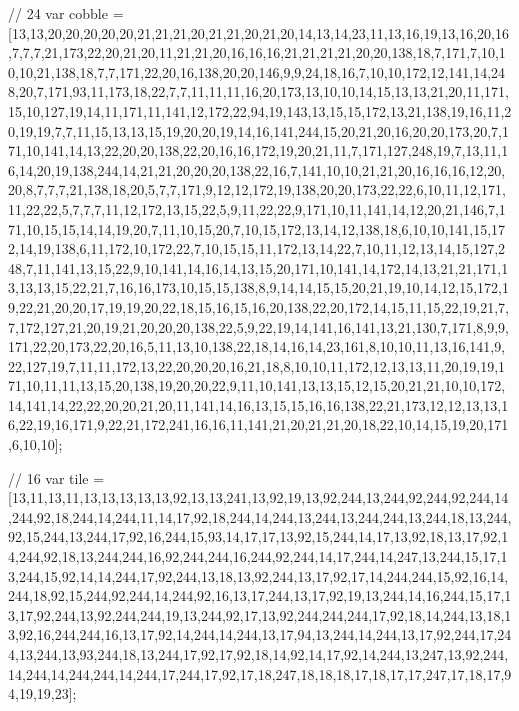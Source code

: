 // 24
var cobble = [13,13,20,20,20,20,20,21,21,21,20,21,21,20,21,20,14,13,14,23,11,13,16,19,13,16,20,16,7,7,7,21,173,22,20,21,20,11,21,21,20,16,16,16,21,21,21,21,20,20,138,18,7,171,7,10,10,10,21,138,18,7,7,171,22,20,16,138,20,20,146,9,9,24,18,16,7,10,10,172,12,141,14,248,20,7,171,93,11,173,18,22,7,7,11,11,11,16,20,173,13,10,10,14,15,13,13,21,20,11,171,15,10,127,19,14,11,171,11,141,12,172,22,94,19,143,13,15,15,172,13,21,138,19,16,11,20,19,19,7,7,11,15,13,13,15,19,20,20,19,14,16,141,244,15,20,21,20,16,20,20,173,20,7,171,10,141,14,13,22,20,20,138,22,20,16,16,172,19,20,21,11,7,171,127,248,19,7,13,11,16,14,20,19,138,244,14,21,21,20,20,20,138,22,16,7,141,10,10,21,21,20,16,16,16,12,20,20,8,7,7,7,21,138,18,20,5,7,7,171,9,12,12,172,19,138,20,20,173,22,22,6,10,11,12,171,11,22,22,5,7,7,7,11,12,172,13,15,22,5,9,11,22,22,9,171,10,11,141,14,12,20,21,146,7,171,10,15,15,14,14,19,20,7,11,10,15,20,7,10,15,172,13,14,12,138,18,6,10,10,141,15,172,14,19,138,6,11,172,10,172,22,7,10,15,15,11,172,13,14,22,7,10,11,12,13,14,15,127,248,7,11,141,13,15,22,9,10,141,14,16,14,13,15,20,171,10,141,14,172,14,13,21,21,171,13,13,13,15,22,21,7,16,16,173,10,15,15,138,8,9,14,14,15,15,20,21,19,10,14,12,15,172,19,22,21,20,20,17,19,19,20,22,18,15,16,15,16,20,138,22,20,172,14,15,11,15,22,19,21,7,7,172,127,21,20,19,21,20,20,20,138,22,5,9,22,19,14,141,16,141,13,21,130,7,171,8,9,9,171,22,20,173,22,20,16,5,11,13,10,138,22,18,14,16,14,23,161,8,10,10,11,13,16,141,9,22,127,19,7,11,11,172,13,22,20,20,20,16,21,18,8,10,10,11,172,12,13,13,11,20,19,19,171,10,11,11,13,15,20,138,19,20,20,22,9,11,10,141,13,13,15,12,15,20,21,21,10,10,172,14,141,14,22,22,20,20,21,20,11,141,14,16,13,15,15,16,16,138,22,21,173,12,12,13,13,16,22,19,16,171,9,22,21,172,241,16,16,11,141,21,20,21,21,20,18,22,10,14,15,19,20,171,6,10,10];

// 16
var tile = [13,11,13,11,13,13,13,13,13,92,13,13,241,13,92,19,13,92,244,13,244,92,244,92,244,14,244,92,18,244,14,244,11,14,17,92,18,244,14,244,13,244,13,244,244,13,244,18,13,244,92,15,244,13,244,17,92,16,244,15,93,14,17,17,13,92,15,244,14,17,13,92,18,13,17,92,14,244,92,18,13,244,244,16,92,244,244,16,244,92,244,14,17,244,14,247,13,244,15,17,13,244,15,92,14,14,244,17,92,244,13,18,13,92,244,13,17,92,17,14,244,244,15,92,16,14,244,18,92,15,244,92,244,14,244,92,16,13,17,244,13,17,92,19,13,244,14,16,244,15,17,13,17,92,244,13,92,244,244,19,13,244,92,17,13,92,244,244,244,17,92,18,14,244,13,18,13,92,16,244,244,16,13,17,92,14,244,14,244,13,17,94,13,244,14,244,13,17,92,244,17,244,13,244,13,93,244,18,13,244,17,92,17,92,18,14,92,14,17,92,14,244,13,247,13,92,244,14,244,14,244,244,14,244,17,244,17,92,17,18,247,18,18,18,17,18,17,17,247,17,18,17,94,19,19,23];


